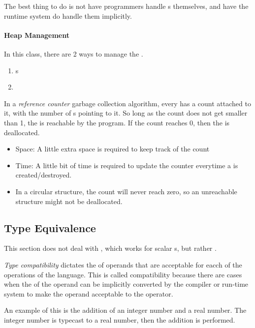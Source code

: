 The best thing to do is not have programmers handle s themselves, and have the runtime system do handle them implicitly.

\paragraph{Heap Management}\label{par:Pointer-Heap_Management}
In this class, there are 2 ways to manage the .
\begin{enumerate}[noitemsep]
\item {}s
\item {}
\end{enumerate}

\begin{definition}\label{def:Reference_Counter}
  In a \emph{reference counter} garbage collection algorithm, every  has a count attached to it, with the number of s pointing to it.
  So long as the count does not get smaller than 1, the  is reachable by the program.
  If the count reaches 0, then the  is deallocated.

  \begin{remark}[Problems]\label{rmk:Reference_Counter_Problems}
    \begin{itemize}[noitemsep]
    \item Space: A little extra space is required to keep track of the count
    \item Time: A little bit of time is required to update the counter everytime a  is created/destroyed.
    \item In a circular structure, the  count will never reach zero, so an unreachable structure might not be deallocated.
    \end{itemize}
  \end{remark}


\end{definition}

\subsection{Type Equivalence}\label{subsec:Type_Equivalence}
This section does not deal with , which works for scalar s, but rather .
\begin{definition}\label{def:Type_Compatibility}
  \emph{Type compatibility} dictates the  of operands that are acceptable for eacch of the operations of the language.
  This is called compatibility because there are cases when the  of the operand can be implicitly converted by the compiler or run-time system to make the operand acceptable to the operator.

  An example of this is the addition of an integer number and a real number.
  The integer number is typecast to a real number, then the addition is performed.
\end{definition}

